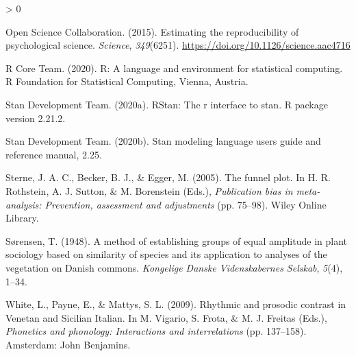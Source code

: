 \documentclass[
  english,
  man,floatsintext]{apa6}
\newlength{\cslhangindent}
\newenvironment{CSLReferences}[2] %
 {%
  \setlength{\parindent}{0pt}
  \ifodd #1 \everypar{\setlength{\hangindent}{\cslhangindent}}\ignorespaces\fi
  \ifnum #2 > 0
  \setlength{\parskip}{#2\baselineskip}
  \fi
 }%
 {}
\begin{document}
\begin{CSLReferences}{1}{0}
\leavevmode\hypertarget{ref-open2015estimating}{}%
Open Science Collaboration. (2015). Estimating the reproducibility of psychological science. \emph{Science}, \emph{349}(6251). \url{https://doi.org/10.1126/science.aac4716}

\leavevmode\hypertarget{ref-r-core-team2020}{}%
R Core Team. (2020). R: A language and environment for statistical computing. R Foundation for Statistical Computing, Vienna, Austria.

\leavevmode\hypertarget{ref-stan-development-team2020a}{}%
Stan Development Team. (2020a). RStan: The r interface to stan. R package version 2.21.2.

\leavevmode\hypertarget{ref-stan-development-team2020}{}%
Stan Development Team. (2020b). Stan modeling language users guide and reference manual, 2.25.

\leavevmode\hypertarget{ref-sterne2005}{}%
Sterne, J. A. C., Becker, B. J., \& Egger, M. (2005). The funnel plot. In H. R. Rothstein, A. J. Sutton, \& M. Borenstein (Eds.), \emph{Publication bias in meta-analysis: Prevention, assessment and adjustments} (pp. 75--98). Wiley Online Library.

\leavevmode\hypertarget{ref-sorensen1948}{}%
Sørensen, T. (1948). A method of establishing groups of equal amplitude in plant sociology based on similarity of species and its application to analyses of the vegetation on {D}anish commons. \emph{Kongelige Danske Videnskabernes Selskab}, \emph{5}(4), 1--34.

\leavevmode\hypertarget{ref-white2009}{}%
White, L., Payne, E., \& Mattys, S. L. (2009). Rhythmic and prosodic contrast in {V}enetan and {S}icilian {I}talian. In M. Vigario, S. Frota, \& M. J. Freitas (Eds.), \emph{Phonetics and phonology: Interactions and interrelations} (pp. 137--158). Amsterdam: John Benjamins.

\end{CSLReferences}

\endgroup
\end{document}

